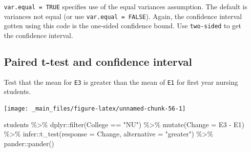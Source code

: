 \documentclass[
]{book}
\newenvironment{Shaded}{\begin{snugshade}}{\end{snugshade}}
\newcommand{\AttributeTok}[1]{\textcolor[rgb]{0.77,0.63,0.00}{#1}}
\newcommand{\FunctionTok}[1]{\textcolor[rgb]{0.00,0.00,0.00}{#1}}
\newcommand{\NormalTok}[1]{#1}
\newcommand{\SpecialCharTok}[1]{\textcolor[rgb]{0.00,0.00,0.00}{#1}}
\newcommand{\StringTok}[1]{\textcolor[rgb]{0.31,0.60,0.02}{#1}}
\begin{document}
\texttt{var.equal\ =\ TRUE} specifies use of the equal variances assumption. The default is variances not equal (or use \texttt{var.equal\ =\ FALSE}). Again, the confidence interval gotten using this code is the one-sided confidence bound. Use \texttt{two-sided} to get the confidence interval.

\hypertarget{paired-t-test-and-confidence-interval}{%
\subsection{Paired t-test and confidence interval}\label{paired-t-test-and-confidence-interval}}

Test that the mean for \texttt{E3} is greater than the mean of \texttt{E1} for first year nursing students.

\texttt{[image: \_main\_files/figure-latex/unnamed-chunk-56-1]}

\begin{Shaded}
\begin{Highlighting}[]
\NormalTok{students }\SpecialCharTok{\%\textgreater{}\%} 
\NormalTok{  dplyr}\SpecialCharTok{::}\FunctionTok{filter}\NormalTok{(College }\SpecialCharTok{==} \StringTok{"NU"}\NormalTok{) }\SpecialCharTok{\%\textgreater{}\%} 
  \FunctionTok{mutate}\NormalTok{(}\AttributeTok{Change =}\NormalTok{ E3 }\SpecialCharTok{{-}}\NormalTok{ E1) }\SpecialCharTok{\%\textgreater{}\%} 
\NormalTok{  infer}\SpecialCharTok{::}\FunctionTok{t\_test}\NormalTok{(}\AttributeTok{response =}\NormalTok{ Change, }\AttributeTok{alternative =} \StringTok{"greater"}\NormalTok{) }\SpecialCharTok{\%\textgreater{}\%} 
\NormalTok{  pander}\SpecialCharTok{::}\FunctionTok{pander}\NormalTok{()}
\end{Highlighting}
\end{Shaded}
\end{document}
